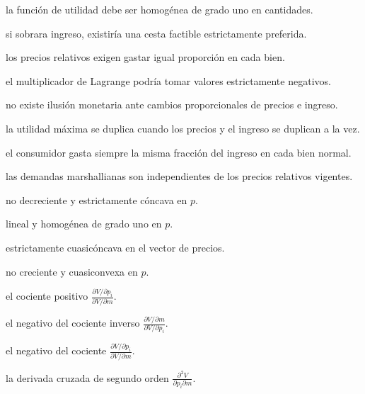 \begin{opts}
    \item la función de utilidad debe ser homogénea de grado uno en cantidades.
    \item si sobrara ingreso, existiría una cesta factible estrictamente preferida.
    \item los precios relativos exigen gastar igual proporción en cada bien.
    \item el multiplicador de Lagrange podría tomar valores estrictamente negativos.
\end{opts}

\begin{opts}
    \item no existe ilusión monetaria ante cambios proporcionales de precios e ingreso.
    \item la utilidad máxima se duplica cuando los precios y el ingreso se duplican a la vez.
    \item el consumidor gasta siempre la misma fracción del ingreso en cada bien normal.
    \item las demandas marshallianas son independientes de los precios relativos vigentes.
\end{opts}

\begin{opts}
    \item no decreciente y estrictamente cóncava en $p$.
    \item lineal y homogénea de grado uno en $p$.
    \item estrictamente cuasicóncava en el vector de precios.
    \item no creciente y cuasiconvexa en $p$.
\end{opts}

\begin{opts}
    \item el cociente positivo $\frac{\partial V/\partial p_i}{\partial V/\partial m}$.
    \item el negativo del cociente inverso $\frac{\partial V/\partial m}{\partial V/\partial p_i}$.
    \item el negativo del cociente $\frac{\partial V/\partial p_i}{\partial V/\partial m}$.
    \item la derivada cruzada de segundo orden $\frac{\partial^2 V}{\partial p_i \partial m}$.
\end{opts}

